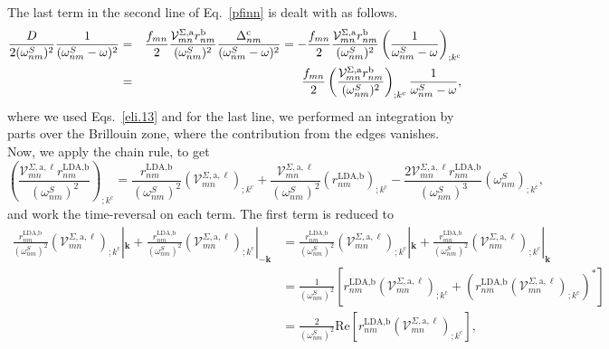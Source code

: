 The last term in the second line of Eq.~\eqref{pfinn} is dealt with as
follows.
\begin{eqnarray}\label{dresn}
\frac{D}{2(\omega^S_{nm})^2}\frac{1}{(\omega^S_{nm}-\omega)^2}
&=&
\frac{f_{mn}}{2}\frac{{\mathbf{\cal V}}^{\Sigma,\mathrm{a}}_{mn}r^{\mathrm{b}}_{nm}}{(\omega^S_{nm})^2}
\frac{\Delta^{\mathrm{c}}_{nm}}{(\omega^S_{nm}-\omega)^2} 
=
-
\frac{f_{mn}}{2}
\frac{{\mathbf{\cal V}}^{\Sigma,\mathrm{a}}_{mn}r^{\mathrm{b}}_{nm}}{(\omega^S_{nm})^2}
\left(
\frac{1}{\omega^S_{nm}-\omega}
\right)_{;k^{\mathrm{c}}}
\nonumber\\
&=&
\frac{f_{mn}}{2}
\left(
\frac{{\mathbf{\cal V}}^{\Sigma,\mathrm{a}}_{mn}r^{\mathrm{b}}_{nm}}{(\omega^S_{nm})^2}
\right)_{;k^{\mathrm{c}}}
\frac{1}{\omega^S_{nm}-\omega}
,
\end{eqnarray} 
where we used Eqs.~\eqref{eli.13}  and for the last
line, we performed an
integration by parts over the Brillouin zone,
where the contribution from the edges vanishes.\cite{ashcroft_solid_1976}
Now, we apply the chain rule, to get
\begin{equation}\label{chr}
    \left(\frac{\mathcal{V}^{\Sigma,\text{a},\ell}_{mn}r^{\text{LDA,b}}_{nm}}
    {(\omega^{S}_{nm})^2}\right)_{;k^{\text{c}}}
=   \frac{r^{\text{LDA,b}}_{nm}}{(\omega^{S}_{nm})^2}
    \left(\mathcal{V}^{\Sigma,\text{a},\ell}_{mn}\right)_{;k^{\text{c}}}
+   \frac{\mathcal{V}^{\Sigma,\text{a},\ell}_{mn}}{(\omega^{S}_{nm})^2}
    \left(r^{\text{LDA,b}}_{nm}\right)_{;k^{\text{c}}}
-   \frac{2\mathcal{V}^{\Sigma,\text{a},\ell}_{mn}
    r^{\text{LDA,b}}_{nm}}{(\omega^{S}_{nm})^3}
    \left(\omega^{S}_{nm}\right)_{;k^{\text{c}}}
,
\end{equation}
and work the time-reversal on each term.
The first term is reduced to
\begin{align}\label{first_term_gen_deriv}
    \frac{r^{\text{LDA,b}}_{nm}}{(\omega^{S}_{nm})^{2}}
    \left(\mathcal{V}^{\Sigma,\text{a},\ell}_{mn}\right)
    _{;k^{\text{c}}}|_{\mathbf{k}}
+   \frac{r^{\text{LDA,b}}_{nm}}{(\omega^{S}_{nm})^{2}}
    \left(\mathcal{V}^{\Sigma,\text{a},\ell}_{mn}\right)
    _{;k^{\text{c}}}|_{-\mathbf{k}}
&=  \frac{r^{\text{LDA,b}}_{nm}}{(\omega^{S}_{nm})^{2}}
    \left(\mathcal{V}^{\Sigma,\text{a},\ell}_{mn}\right)
    _{;k^{\text{c}}}|_{\mathbf{k}}
+   \frac{r^{\text{LDA,b}}_{mn}}{(\omega^{S}_{nm})^{2}}
    \left(\mathcal{V}^{\Sigma,\text{a},\ell}_{nm}\right)
    _{;k^{\text{c}}}|_{\mathbf{k}}\nonumber\\
&=  \frac{1}{(\omega^{S}_{nm})^{2}}\left[r^{\text{LDA,b}}_{nm}
    \left(\mathcal{V}^{\Sigma,\text{a},\ell}_{mn}\right)
    _{;k^{\text{c}}}
+   \left(r^{\text{LDA,b}}_{nm}
    \left(\mathcal{V}^{\Sigma,\text{a},\ell}_{mn}\right)
    _{;k^{\text{c}}}\right)^*\right]\nonumber\\
&=  \frac{2}{(\omega^{S}_{nm})^{2}}\mathrm{Re}\left[r^{\text{LDA,b}}_{nm}
    \left(\mathcal{V}^{\Sigma,\text{a},\ell}_{mn}\right)_{;k^{\text{c}}}\right]
,
\end{align}
